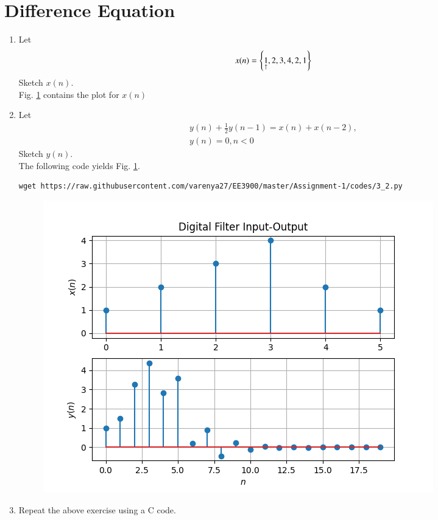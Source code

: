 \documentclass[journal,12pt,twocolumn]{IEEEtran}
\renewcommand\thesection{\arabic{section}}
\begin{document}
\section{Difference Equation}
\begin{enumerate}[label=\thesection.\arabic*,ref=\thesection.\theenumi]
\item Let \label{def:xn}
\begin{equation}
x(n) = \left\{\underset{\uparrow}{1},2,3,4,2,1\right\}\label{eq:xn}
\end{equation}
Sketch $x(n)$.\\
\solution Fig. \ref{fig:xnyn} contains the plot for $x(n)$
\item Let
\begin{multline}
\label{eq:iir_filter}
y(n) + \frac{1}{2}y(n-1) = x(n) + x(n-2), 
\\
 y(n) = 0, n < 0
\end{multline}
Sketch $y(n)$.
\\
\solution The following code yields Fig. \ref{fig:xnyn}.
\begin{lstlisting}
wget https://raw.githubusercontent.com/varenya27/EE3900/master/Assignment-1/codes/3_2.py
\end{lstlisting}
\begin{figure}[!ht]
\begin{center}
\includegraphics[width=\columnwidth]{figures/Figure_1.png}
\end{center}
\label{fig:xnyn}	
\end{figure}
\item Repeat the above exercise using a C code.\\
\solution


\end{enumerate}
\end{document}
